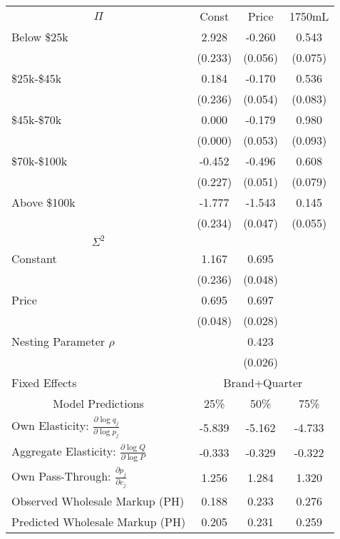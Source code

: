 \begin{tabular}{lccc} 
\toprule 
\multicolumn{1}{c}{$\Pi$} &  Const &  Price &  1750mL \\ 
\cmidrule(r){1-1} \cmidrule(rrr){2-4} 
Below \$25k  &  2.928 & -0.260 &   0.543 \\
            &  (0.233) &  (0.056) &   (0.075) \\
\$25k-\$45k   &  0.184 & -0.170 &   0.536 \\
            &  (0.236) &  (0.054) &   (0.083) \\
\$45k-\$70k   &  0.000 & -0.179 &   0.980 \\
            &  (0.000) &  (0.053) &   (0.093) \\
\$70k-\$100k  & -0.452 & -0.496 &   0.608 \\
            &  (0.227) &  (0.051) &   (0.079) \\
Above \$100k & -1.777 & -1.543 &   0.145 \\
            &  (0.234) &  (0.047) &   (0.055) \\
\midrule \multicolumn{1}{c}{$\Sigma^2$}& \multicolumn{2}{c}{} \\ \cmidrule(r){1-1} \cmidrule(rrr){2-4}
Constant    &   1.167 & 0.695   &  \\
            &  (0.236)&(0.048) &   \\
Price       &   0.695 & 0.697  \\
            &   (0.048) &(0.028) \\
\midrule  
\multicolumn{1}{l}{Nesting Parameter $\rho$} &  &0.423&    \\ 
& &(0.026)&     \\ 
\multicolumn{1}{l}{Fixed Effects} &   \multicolumn{3}{c}{Brand+Quarter}\\ 
\midrule 
\multicolumn{1}{c}{Model Predictions}& 25\% & 50\% & 75\% \\ \midrule\midrule
Own Elasticity:  $\frac{\partial \log q_j}{\partial \log p_j}$                  & -5.839 & -5.162 & -4.733 \\
Aggregate Elasticity: $\frac{\partial \log Q}{\partial \log P}$            & -0.333 & -0.329 & -0.322 \\
Own Pass-Through: $\frac{\partial p_j}{\partial c_j}$          & 1.256 & 1.284 &  1.320 \\
Observed Wholesale Markup (PH)  &  0.188 &  0.233 &  0.276 \\
Predicted Wholesale Markup (PH) &  0.205 &  0.231 &  0.259 \\
\bottomrule 
\end{tabular}